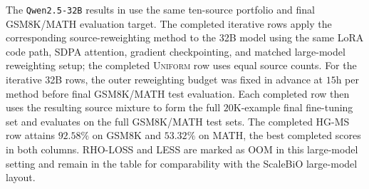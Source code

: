 \documentclass{article}
\theoremstyle{normaltheorem}
\begin{document}
The \texttt{Qwen2.5-32B} results in  use the same ten-source portfolio and final GSM8K/MATH evaluation target. The completed iterative rows apply the corresponding source-reweighting method to the 32B model using the same LoRA code path, SDPA attention, gradient checkpointing, and matched large-model reweighting setup; the completed \textsc{Uniform} row uses equal source counts. For the iterative 32B rows, the outer reweighting budget was fixed in advance at \(15\)h per method before final GSM8K/MATH test evaluation. Each completed row then uses the resulting source mixture to form the full \(20\)K-example final fine-tuning set and evaluates on the full GSM8K/MATH test sets. The completed \textsc{HG-MS} row attains \(92.58\%\) on GSM8K and \(53.32\%\) on MATH, the best completed scores in both columns. \textsc{RHO-LOSS} and \textsc{LESS} are marked as OOM in this large-model setting and remain in the table for comparability with the ScaleBiO large-model layout.
\end{document}
